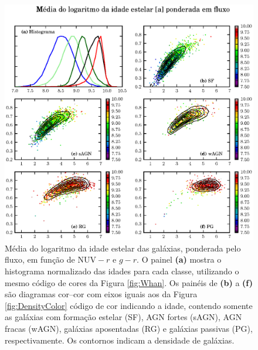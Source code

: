 \begin{figure}
	\includegraphics{figuras/uvcolor-color-at_flux-byclass.eps}
	\caption[Idade estelar média ponderada em fluxo no diagrama cor--cor.]
	{Média do logaritmo da idade estelar das galáxias, ponderada pelo fluxo, em
	função de $\mathrm{NUV}-r$ e $g-r$. O painel \textbf{(a)} mostra o histograma
	normalizado das idades para cada classe, utilizando o mesmo código de cores da
	Figura \ref{fig:Whan}. Os painéis de \textbf{(b)} a \textbf{(f)} são diagramas
	cor--cor com eixos iguais aos da Figura \ref{fig:DensityColor} código de cor
	indicando a idade, contendo somente as galáxias com formação estelar (SF), AGN
	fortes (sAGN), AGN fracas (wAGN), galáxias aposentadas (RG) e galáxias passivas
	(PG), respectivamente. Os contornos indicam a densidade de galáxias.}
	\label{fig:ATFluxColor}
\end{figure}

